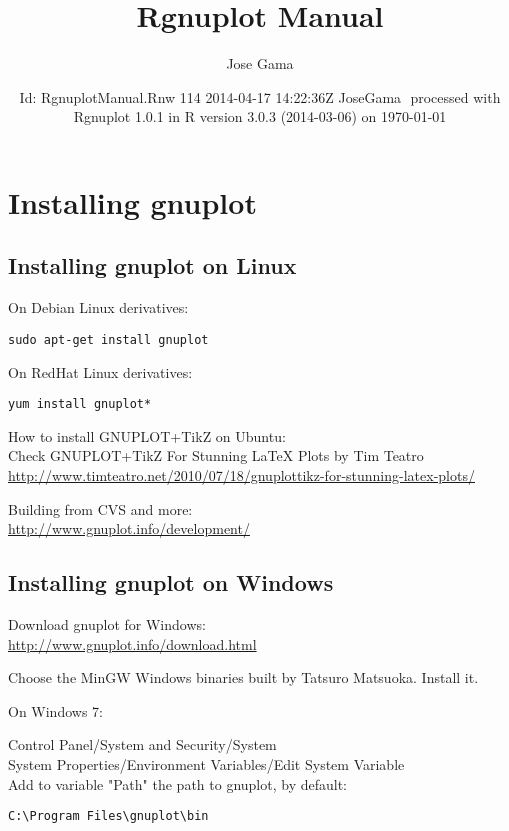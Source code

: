 \documentclass[a4paper,10pt]{amsart}
\title{Rgnuplot Manual}
\author{Jose Gama}
\date{$ $Id: RgnuplotManual.Rnw 114 2014-04-17 14:22:36Z JoseGama $ $
  processed with Rgnuplot
1.0.1
in R version 3.0.3 (2014-03-06) on \today}
\begin{document}




\maketitle

\tableofcontents

\section{Installing gnuplot}
\subsection{Installing gnuplot on Linux\\}

On Debian Linux derivatives:\\
\begin{verbatim}sudo apt-get install gnuplot\end{verbatim}

On RedHat Linux derivatives:\\
\begin{verbatim}yum install gnuplot*\end{verbatim}

How to install GNUPLOT+TikZ on Ubuntu:\\
Check GNUPLOT+TikZ For Stunning LaTeX Plots by Tim Teatro\\
\url{http://www.timteatro.net/2010/07/18/gnuplottikz-for-stunning-latex-plots/}

Building from CVS and more:\\
\url{http://www.gnuplot.info/development/}

\subsection{Installing gnuplot on Windows\\}

Download gnuplot for Windows:\\
\url{http://www.gnuplot.info/download.html}

Choose the MinGW Windows binaries built by Tatsuro Matsuoka. Install it.

On Windows 7:

Control Panel/System and Security/System\\
System Properties/Environment Variables/Edit System Variable\\
Add to variable "Path" the path to gnuplot, by default:\\
\begin{verbatim}C:\Program Files\gnuplot\bin\end{verbatim}
\end{document}
